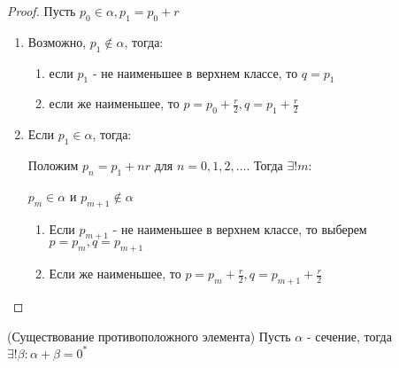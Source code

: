 \begin{proof}
    Пусть $p_0 \in \alpha, p_1 = p_0 + r$

    \begin{enumerate}
        \item Возможно, $p_1 \notin \alpha$, тогда:
        
        \begin{enumerate}
            \item если $p_1$ - не наименьшее в верхнем классе, то $q = p_1$
            \item если же наименьшее, то $p = p_0 + \frac{r}{2}, q = p_1 + \frac{r}{2}$
        \end{enumerate}
        \item Если $p_1 \in \alpha$, тогда:
        
        Положим $p_n = p_1 + nr$ для $n = 0, 1, 2, \ldots$. Тогда $\exists! m$: 
        
        $p_m \in \alpha$ и $p_{m+1} \notin \alpha$

        \begin{enumerate}
            \item Если $p_{m+1}$ - не наименьшее в верхнем классе, то выберем $p = p_m, q = p_{m+1}$
            \item Если же наименьшее, то $p = p_m + \frac{r}{2}, q = p_{m+1} + \frac{r}{2}$
        \end{enumerate}
    \end{enumerate}
\end{proof}

\begin{theorem} (Существование противоположного элемента)
    Пусть $\alpha$ - сечение, тогда $\exists! \beta: \alpha + \beta = 0^*$
\end{theorem}

